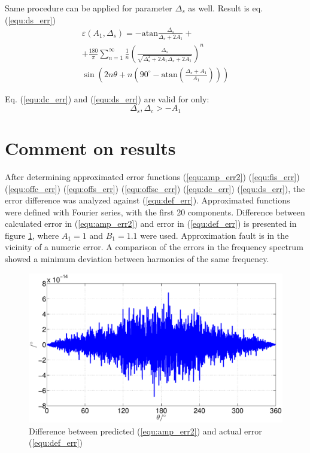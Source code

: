 \documentclass[a4paper]{article}
\begin{document}
Same procedure can be applied for parameter $\Delta_s$ as well. Result is eq.(\ref{equ:ds_err})
\begin{multline}
\label{equ:ds_err}
\varepsilon(A_1, \Delta_s) = -\mathrm{atan}\frac{\Delta_s}{\Delta_s+2 A_1}+\\+\frac{180}{\pi} \sum_{n=1}^{\infty}\frac{1}{n} (\frac{\Delta_s}{\sqrt{\Delta_s^2+2 A_1 \Delta_s+2A_1}})^n\\ \sin (2n \theta+n (90^\circ- \mathrm{ atan}(\frac{\Delta_s+A_1}{A_1})))
\end{multline}

Eq. (\ref{equ:dc_err}) and (\ref{equ:ds_err}) are valid for only: 
\begin{equation*}
\Delta_s, \Delta_c > -A_1
\end{equation*}

\section{Comment on results}
After determining approximated error functions (\ref{equ:amp_err2}) (\ref{equ:fis_err}) (\ref{equ:offc_err}) (\ref{equ:offs_err}) (\ref{equ:offsc_err}) (\ref{equ:dc_err}) (\ref{equ:ds_err}),
the error difference was analyzed against (\ref{equ:def_err}). Approximated functions were defined with Fourier series, with the first 20 components.
Difference between calculated error in (\ref{equ:amp_err2}) and error in (\ref{equ:def_err})  is presented in figure \ref{fig:razlika}, where $A_1 = 1$ and $B_1 = 1.1$ were used.
Approximation fault is in the vicinity of a numeric error.
A comparison of the errors in the frequency spectrum showed a minimum deviation between harmonics of the same frequency.

\begin{figure}[!htb]
	\begin{center}
		\includegraphics[width=\linewidth]{./Slike/razlika_amp.eps}
		\caption{Difference between predicted (\ref{equ:amp_err2}) and actual error (\ref{equ:def_err})} \label{fig:razlika}
	\end{center}
\end{figure}
\end{document}
